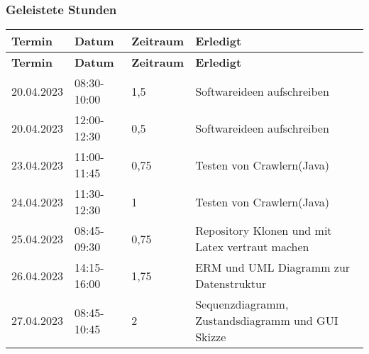 \subsubsection{Geleistete Stunden}
\begin{flushleft}
		\begin{longtable}{p{2cm}p{}p{2cm}p{}}
            \toprule
            \textbf{Termin} & \textbf{Datum} & \textbf{Zeitraum} & \textbf{Erledigt}\\
            \midrule\endfirsthead
            \toprule
            \textbf{Termin} & \textbf{Datum} & \textbf{Zeitraum} & \textbf{Erledigt}\\
            \midrule\endhead
            	20.04.2023 & 08:30-10:00 & 1,5 & Softwareideen aufschreiben\\ \midrule
    			20.04.2023 & 12:00-12:30 & 0,5 & Softwareideen aufschreiben\\ \midrule
    			23.04.2023 & 11:00-11:45 & 0,75 & Testen von Crawlern(Java)\\ \midrule
    			24.04.2023 & 11:30-12:30 & 1 & Testen von Crawlern(Java)\\ \midrule
    			25.04.2023 & 08:45-09:30 & 0,75 & Repository Klonen und mit Latex vertraut machen\\ \midrule
    			26.04.2023 & 14:15-16:00 & 1,75 & ERM und UML Diagramm zur Datenstruktur\\ \midrule
    			27.04.2023 & 08:45-10:45 & 2 & Sequenzdiagramm, Zustandsdiagramm und GUI Skizze\\
            \bottomrule
    \end{longtable}
\end{flushleft}